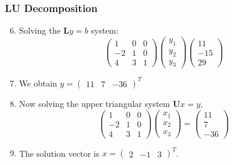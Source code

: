 \documentclass[10pt,compress,handout,ignorenonframetext]{beamer}
\begin{document}
\begin{frame}
  \frametitle{LU Decomposition} 
  \begin{enumerate}
  \setcounter{enumi}{5}
     \item <1-> Solving the $\bm{L}y=b$ system:
        \begin{displaymath}
          \begin{pmatrix}
             1 & 0 & 0 \\ -2 & 1 & 0 \\ 4 & 3 & 1
          \end{pmatrix}
          \begin{pmatrix}
            y_{1} \\ y_{2} \\ y_{3}
          \end{pmatrix}
          \begin{pmatrix}
            11 \\ -15 \\ 29
          \end{pmatrix}
        \end{displaymath}
     \item <2-> We obtain $y=\begin{pmatrix}11 & 7 & -36\end{pmatrix}^{T}$
     \item <3-> Now solving the upper triangular system $\bm{U}x=y$,
        \begin{displaymath}
          \begin{pmatrix}
            1 & 0 & 0 \\ -2 & 1 & 0 \\ 4 & 3 & 1
          \end{pmatrix}
          \begin{pmatrix}
           x_{1} \\ x_{2} \\ x_{3}
          \end{pmatrix}=
          \begin{pmatrix}
             11 \\ 7 \\ -36
          \end{pmatrix}
        \end{displaymath}
     \item <4-> The solution vector is $x=\begin{pmatrix}2 & -1 & 3 \end{pmatrix}^{T}$.
  \end{enumerate}
\end{frame}
\end{document}
